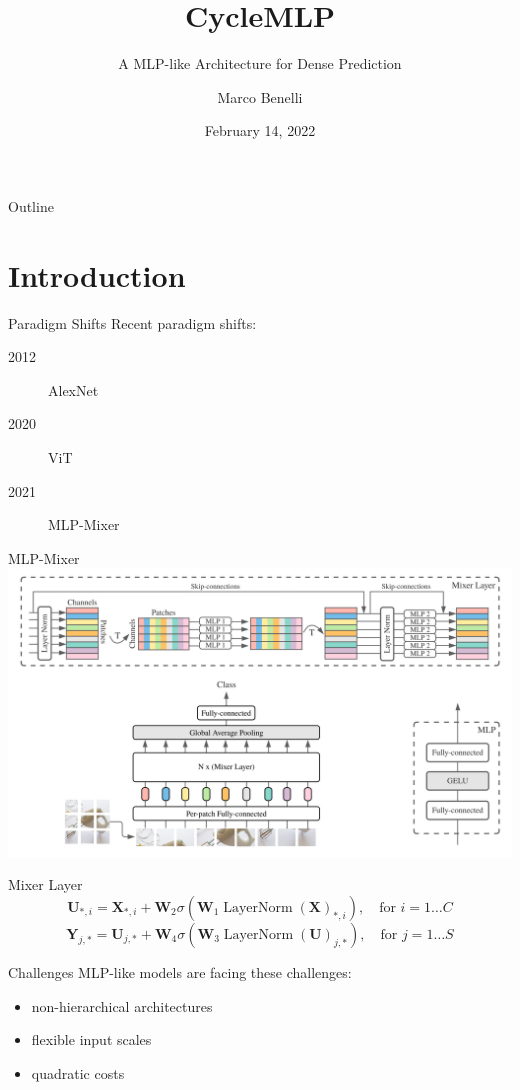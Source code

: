 \documentclass{beamer}
\title{CycleMLP}
\subtitle{A MLP-like Architecture for Dense Prediction}
\author{Marco Benelli}
\institute{University of Florence}
\date{February 14, 2022}
\DeclareMathOperator{\layernorm}{LayerNorm}
\begin{document}
\begin{frame}
    \titlepage
\end{frame}

\begin{frame}{Outline}
    \tableofcontents
\end{frame}

\section{Introduction}

\begin{frame}{Paradigm Shifts}
    Recent paradigm shifts:
    \begin{description}
        \item[2012] AlexNet
        \item[2020] ViT
        \item[2021] MLP-Mixer
    \end{description}
\end{frame}

\begin{frame}{MLP-Mixer}
    \includegraphics[width=\textwidth]{figures/mixer_figure.png}
\end{frame}

\begin{frame}{Mixer Layer}
    $$\mathbf{U}_{*,i} = \mathbf{X}_{*,i} + \mathbf{W}_2 \sigma(\mathbf{W}_1 \layernorm(\mathbf{X})_{*,i}), \quad \text{for } i = 1 \dots C$$
    $$\mathbf{Y}_{j,*} = \mathbf{U}_{j,*} + \mathbf{W}_4 \sigma(\mathbf{W}_3 \layernorm(\mathbf{U})_{j,*}), \quad \text{for } j = 1 \dots S$$
\end{frame}

\begin{frame}{Challenges}
    MLP-like models are facing these challenges:
    \begin{itemize}
        \item non-hierarchical architectures
        \item flexible input scales
        \item quadratic costs
    \end{itemize}
\end{frame}
\end{document}
